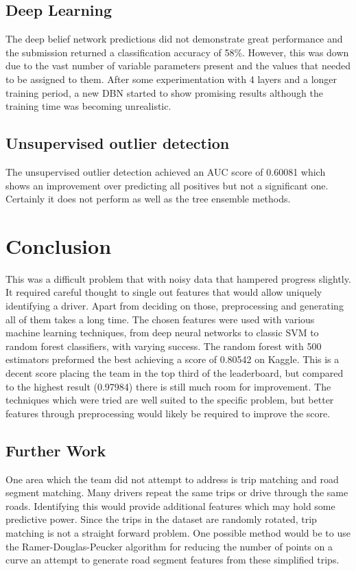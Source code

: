\documentclass[a4paper, 11pt, twocolumn]{report}
\begin{document}
\subsection{Deep Learning}

The deep belief network predictions did not demonstrate great performance and the submission returned a classification accuracy of 58\%. However, this was down due to the vast number of variable parameters present and the values that needed to be assigned to them. After some experimentation with 4 layers and a longer training period, a new DBN started to show promising results although the training time was becoming unrealistic.

\subsection{Unsupervised outlier detection}
The unsupervised outlier detection achieved an AUC score of 0.60081 which shows an improvement over predicting all positives but not a significant one. 
Certainly it does not perform as well as the tree ensemble methods.

\section{Conclusion}
This was a difficult problem that with noisy data that hampered progress slightly.
It required careful thought to single out features that would allow uniquely identifying a driver.
Apart from deciding on those, preprocessing and generating all of them takes a long time.
The chosen features were used with various machine learning techniques, from deep neural networks to classic SVM to random forest classifiers, with varying success.
The random forest with 500 estimators preformed the best achieving a score of 0.80542 on Kaggle.
This is a decent score placing the team in the top third of the leaderboard, but compared to the highest result (0.97984) there is still much room for improvement.
The techniques which were tried are well suited to the specific problem, but better features through preprocessing would likely be required to improve the score. 


\subsection{Further Work}
One area which the team did not attempt to address is trip matching and road segment matching. Many drivers repeat the same trips or drive through the same roads. Identifying this would provide additional features which may hold some predictive power. Since the trips in the dataset are randomly rotated, trip matching is not a straight forward problem. One possible method would be to use the Ramer-Douglas-Peucker algorithm\cite{ramer1972iterative} for reducing the number of points on a curve an attempt to generate road segment features from these simplified trips.
\end{document}
